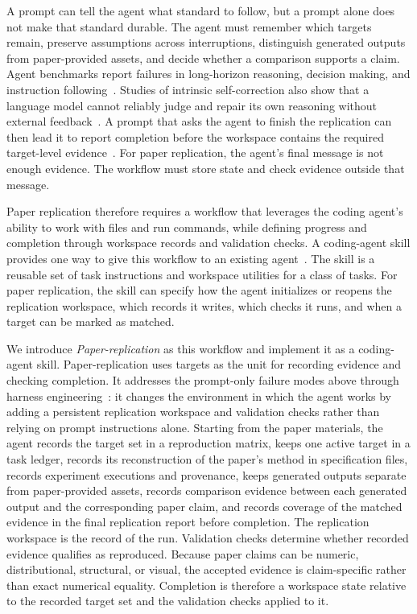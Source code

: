 \documentclass[authoryear,5p,times,nopreprintline]{elsarticle}
\begin{document}
A prompt can tell the agent what standard to follow, but a prompt alone does not make that standard durable.
The agent must remember which targets remain, preserve assumptions across interruptions, distinguish generated outputs from paper-provided assets, and decide whether a comparison supports a claim.
Agent benchmarks report failures in long-horizon reasoning, decision making, and instruction following~\citep{liu2024agentbench}.
Studies of intrinsic self-correction also show that a language model cannot reliably judge and repair its own reasoning without external feedback~\citep{huang2024large}.
A prompt that asks the agent to finish the replication can then lead it to report completion before the workspace contains the required target-level evidence~\citep{manheim2018categorizing}.
For paper replication, the agent's final message is not enough evidence.
The workflow must store state and check evidence outside that message.

Paper replication therefore requires a workflow that leverages the coding agent's ability to work with files and run commands, while defining progress and completion through workspace records and validation checks.
A coding-agent skill provides one way to give this workflow to an existing agent~\citep{anthropic2025agentskills,openai2026codexskills}.
The skill is a reusable set of task instructions and workspace utilities for a class of tasks.
For paper replication, the skill can specify how the agent initializes or reopens the replication workspace, which records it writes, which checks it runs, and when a target can be marked as matched.

We introduce \emph{Paper-replication} as this workflow and implement it as a coding-agent skill.
Paper-replication uses targets as the unit for recording evidence and checking completion.
It addresses the prompt-only failure modes above through harness engineering~\citep{lopopolo2026harness}: it changes the environment in which the agent works by adding a persistent replication workspace and validation checks rather than relying on prompt instructions alone.
Starting from the paper materials, the agent records the target set in a reproduction matrix, keeps one active target in a task ledger, records its reconstruction of the paper's method in specification files, records experiment executions and provenance, keeps generated outputs separate from paper-provided assets, records comparison evidence between each generated output and the corresponding paper claim, and records coverage of the matched evidence in the final replication report before completion.
The replication workspace is the record of the run.
Validation checks determine whether recorded evidence qualifies as reproduced.
Because paper claims can be numeric, distributional, structural, or visual, the accepted evidence is claim-specific rather than exact numerical equality.
Completion is therefore a workspace state relative to the recorded target set and the validation checks applied to it.
\end{document}
